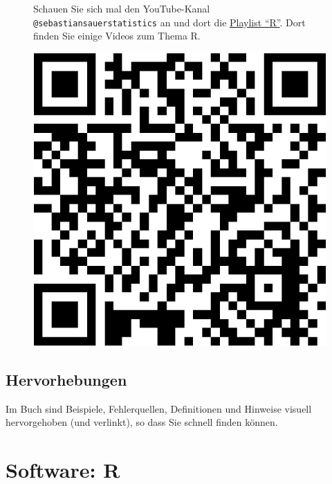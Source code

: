 \documentclass[
  letterpaper,
]{scrbook}
\theoremstyle{definition}
\theoremstyle{definition}
\theoremstyle{definition}
\theoremstyle{remark}
\begin{document}
\begin{figure}

\begin{minipage}{0.80\linewidth}
Schauen Sie sich mal den YouTube-Kanal
\texttt{@sebastiansauerstatistics} an und dort die
\href{https://www.youtube.com/playlist?list=PLRR4REmBgpIEaIyeNBgNGPgmhQJ_T1y8_}{Playlist
``R''}. Dort finden Sie einige Videos zum Thema R.\end{minipage}%
%
\begin{minipage}{0.20\linewidth}

\begin{center}
\includegraphics[width=0.75\linewidth,height=\textheight,keepaspectratio]{005-orga_files/figure-pdf/unnamed-chunk-4-1.pdf}
\end{center}

\end{minipage}%

\end{figure}%

\subsection{Hervorhebungen}\label{hervorhebungen}

Im Buch sind Beispiele, Fehlerquellen, Definitionen und Hinweise visuell
hervorgehoben (und verlinkt), so dass Sie schnell finden können.

\section{Software: R}\label{software-r}
\end{document}
